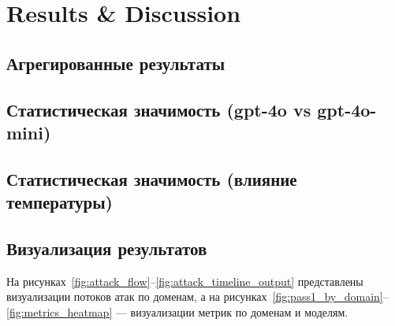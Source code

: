 \documentclass{article}
\begin{document}
\section{Results \& Discussion}

\subsection{Агрегированные результаты}


\setcounter{table}{2}







\subsection{Статистическая значимость (gpt-4o vs gpt-4o-mini)}









\subsection{Статистическая значимость (влияние температуры)}


























\subsection{Визуализация результатов}

На рисунках~\ref{fig:attack_flow}--\ref{fig:attack_timeline_output} представлены визуализации потоков атак по доменам, а на рисунках~\ref{fig:pass1_by_domain}--\ref{fig:metrics_heatmap} --- визуализации метрик по доменам и моделям.
\end{document}
